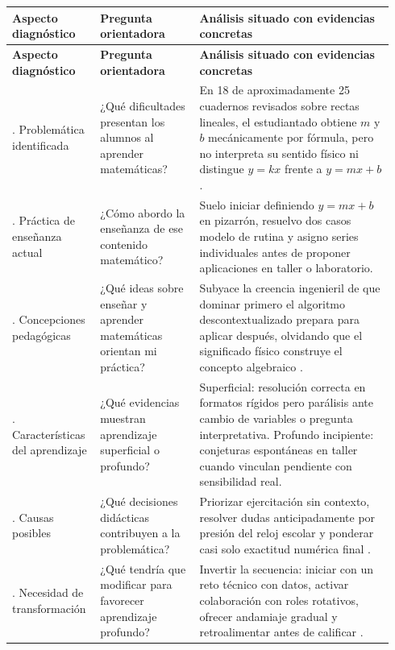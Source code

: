 \documentclass[spanish,letterpaper,oneside]{article}
\begin{document}
{\small{}\renewcommand{\arraystretch}{1.35}
\begin{longtable}{|>{\raggedright\arraybackslash}p{0.20\linewidth}|>{\raggedright\arraybackslash}p{0.25\linewidth}|>{\raggedright\arraybackslash}p{0.49\linewidth}|}\hline
\rowcolor{iiiepePale} \textbf{Aspecto diagnóstico} & \textbf{Pregunta orientadora} & \textbf{Análisis situado con evidencias concretas} \\\hline
\endfirsthead
\hline
\rowcolor{iiiepePale} \textbf{Aspecto diagnóstico} & \textbf{Pregunta orientadora} & \textbf{Análisis situado con evidencias concretas} \\\hline
\endhead
1. Problemática identificada & ¿Qué dificultades presentan los alumnos al aprender matemáticas? & En 18 de aproximadamente 25 cuadernos revisados sobre rectas lineales, el estudiantado obtiene $m$ y $b$ mecánicamente por fórmula, pero no interpreta su sentido físico ni distingue $y=kx$ frente a $y=mx+b$ \citep{star2015algebra}. \\\hline
2. Práctica de enseñanza actual & ¿Cómo abordo la enseñanza de ese contenido matemático? & Suelo iniciar definiendo $y=mx+b$ en pizarrón, resuelvo dos casos modelo de rutina y asigno series individuales antes de proponer aplicaciones en taller o laboratorio. \\\hline
3. Concepciones pedagógicas & ¿Qué ideas sobre enseñar y aprender matemáticas orientan mi práctica? & Subyace la creencia ingenieril de que dominar primero el algoritmo descontextualizado prepara para aplicar después, olvidando que el significado físico construye el concepto algebraico \citep{sawyer2008optimizing}. \\\hline
4. Características del aprendizaje & ¿Qué evidencias muestran aprendizaje superficial o profundo? & Superficial: resolución correcta en formatos rígidos pero parálisis ante cambio de variables o pregunta interpretativa. Profundo incipiente: conjeturas espontáneas en taller cuando vinculan pendiente con sensibilidad real. \\\hline
5. Causas posibles & ¿Qué decisiones didácticas contribuyen a la problemática? & Priorizar ejercitación sin contexto, resolver dudas anticipadamente por presión del reloj escolar y ponderar casi solo exactitud numérica final \citep{eef2017mathematics}. \\\hline
6. Necesidad de transformación & ¿Qué tendría que modificar para favorecer aprendizaje profundo? & Invertir la secuencia: iniciar con un reto técnico con datos, activar colaboración con roles rotativos, ofrecer andamiaje gradual y retroalimentar antes de calificar \citep{eef2021feedback}. \\\hline
\end{longtable}}
\end{document}

